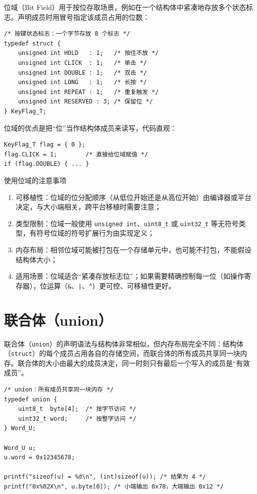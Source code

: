 位域（Bit Field）用于按位存取场景，例如在一个结构体中紧凑地存放多个状态标志。声明成员时用冒号指定该成员占用的位数：

\begin{lstlisting}[style=c]
/* 按键状态标志：一个字节存放 8 个标志 */
typedef struct {
    unsigned int HOLD   : 1;   /* 按住不放 */
    unsigned int CLICK  : 1;   /* 单击 */
    unsigned int DOUBLE : 1;   /* 双击 */
    unsigned int LONG   : 1;   /* 长按 */
    unsigned int REPEAT : 1;   /* 重复触发 */
    unsigned int RESERVED : 3; /* 保留位 */
} KeyFlag_T;
\end{lstlisting}

位域的优点是把“位”当作结构体成员来读写，代码直观：

\begin{lstlisting}[style=c]
KeyFlag_T flag = { 0 };
flag.CLICK = 1;        /* 直接给位域赋值 */
if (flag.DOUBLE) { ... }
\end{lstlisting}

\begin{anybox}{使用位域的注意事项}

\begin{enumerate}
\item 可移植性：位域的位分配顺序（从低位开始还是从高位开始）由编译器或平台决定，与大小端相关，跨平台移植时需要注意；
    \item 类型限制：位域一般使用 \texttt{unsigned int}、\texttt{uint8\_t} 或 \texttt{uint32\_t} 等无符号类型，有符号位域的符号扩展行为由实现定义；
\item 内存布局：相邻位域可能被打包在一个存储单元中，也可能不打包，不能假设结构体大小；
\item 适用场景：位域适合“紧凑存放标志位”；如果需要精确控制每一位（如操作寄存器），位运算（\texttt{\&}、\texttt{|}、\texttt{\^}）更可控、可移植性更好。
\end{enumerate}

\end{anybox}
\section{联合体（union）} \label{sec:union}

联合体（\texttt{union}）的声明语法与结构体非常相似，但内存布局完全不同：结构体（\texttt{struct}）的每个成员占用各自的存储空间，而联合体的所有成员共享同一块内存。联合体的大小由最大的成员决定，同一时刻只有最后一个写入的成员是“有效成员”。

\begin{lstlisting}[style=c]
/* union：所有成员共享同一块内存 */
typedef union {
    uint8_t  byte[4];  /* 按字节访问 */
    uint32_t word;     /* 按整字访问 */
} Word_U;

Word_U u;
u.word = 0x12345678;

printf("sizeof(u) = %d\n", (int)sizeof(u)); /* 结果为 4 */
printf("0x%02X\n", u.byte[0]); /* 小端输出 0x78，大端输出 0x12 */
\end{lstlisting}

